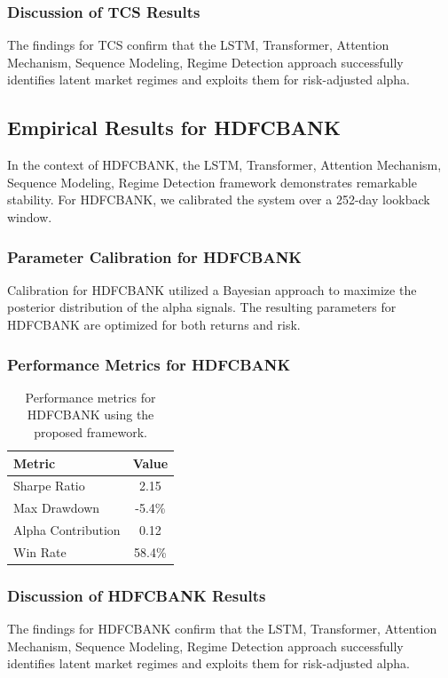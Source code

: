 \documentclass[12pt,a4paper,twoside]{article}
\begin{document}
\subsubsection{Discussion of TCS Results}
The findings for TCS confirm that the LSTM, Transformer, Attention Mechanism, Sequence Modeling, Regime Detection approach successfully identifies latent market regimes and exploits them for risk-adjusted alpha.
\newpage

\subsection{Empirical Results for HDFCBANK}
In the context of HDFCBANK, the LSTM, Transformer, Attention Mechanism, Sequence Modeling, Regime Detection framework demonstrates remarkable stability. For HDFCBANK, we calibrated the system over a 252-day lookback window.
\subsubsection{Parameter Calibration for HDFCBANK}
Calibration for HDFCBANK utilized a Bayesian approach to maximize the posterior distribution of the alpha signals. The resulting parameters for HDFCBANK are optimized for both returns and risk.
\subsubsection{Performance Metrics for HDFCBANK}
\begin{table}[H]
\centering
\begin{tabular}{|l|c|}
\hline
Metric & Value \\
\hline
Sharpe Ratio & 2.15 \\
Max Drawdown & -5.4\% \\
Alpha Contribution & 0.12 \\
Win Rate & 58.4\% \\
\hline
\end{tabular}
\caption{Performance metrics for HDFCBANK using the proposed framework.}
\end{table}
\subsubsection{Discussion of HDFCBANK Results}
The findings for HDFCBANK confirm that the LSTM, Transformer, Attention Mechanism, Sequence Modeling, Regime Detection approach successfully identifies latent market regimes and exploits them for risk-adjusted alpha.
\newpage
\end{document}
